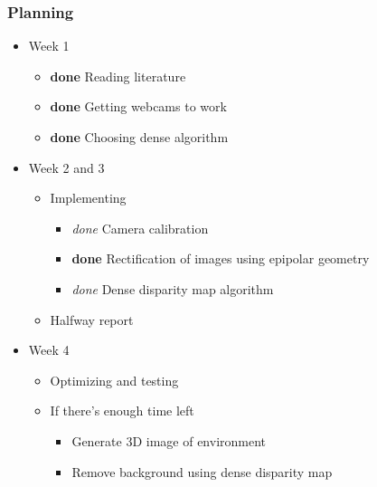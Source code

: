 \documentclass{beamer}
\begin{document}

\frame
{
  \frametitle{Planning}
  \begin{itemize}
    \item Week 1
      \begin{itemize}
        \item {\bf done} Reading literature
        \item {\bf done} Getting webcams to work
        \item {\bf done} Choosing dense algorithm
      \end{itemize}
    \item Week 2 and 3
      \begin{itemize}
        \item Implementing
          \begin{itemize}
            \item \emph{done} Camera calibration
            \item {\bf done} Rectification of images using epipolar geometry
            \item \emph{done} Dense disparity map algorithm
          \end{itemize}
        \item Halfway report
      \end{itemize}
    \item Week 4
      \begin{itemize}
        \item Optimizing and testing
        \item If there's enough time left
          \begin{itemize}
            \item Generate 3D image of environment
            \item Remove background using dense disparity map
          \end{itemize}
      \end{itemize}
  \end{itemize}
}
\end{document}
